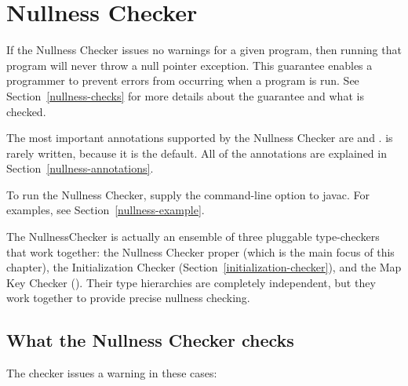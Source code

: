 \htmlhr
\chapter{Nullness Checker\label{nullness-checker}}

If the Nullness Checker issues no warnings for a given program, then
running that program will never throw a null pointer exception.  This
guarantee enables a programmer to prevent errors from occurring when a
program is run.  See Section~\ref{nullness-checks} for more details about
the guarantee and what is checked.

The most important annotations supported by the Nullness Checker are
 and
.
 is rarely written, because it is
the default.  All of the annotations are explained in
Section~\ref{nullness-annotations}.

To run the Nullness Checker, supply the
command-line option to javac.  For
examples, see Section~\ref{nullness-example}.

The NullnessChecker is actually an ensemble of three pluggable
type-checkers that work together: the Nullness Checker proper (which is the
main focus of this chapter), the Initialization Checker
(Section~\ref{initialization-checker}), and the Map Key Checker
().
Their type hierarchies are completely independent, but they work together
to provide precise nullness checking.


\section{What the Nullness Checker checks\label{nullness-checks}}

The checker issues a warning in these cases:

